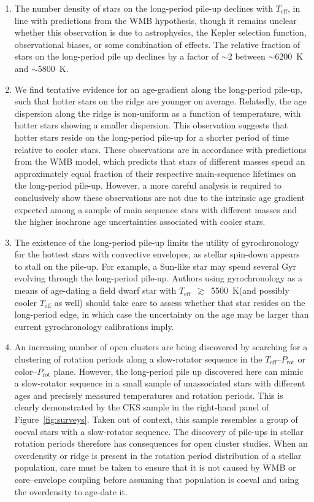 \documentclass[linenumbers,trackchanges,twocolumn]{aastex631}
\newcommand{\teffmin}{5500~K\xspace}
\newcommand{\teff}{\ensuremath{T_{\mathrm{eff}}}\xspace}
\newcommand{\prot}{\ensuremath{P_\mathrm{rot}}\xspace}
\begin{document}
\begin{enumerate}
    \item The number density of stars on the long-period pile-up declines with \teff, in line with predictions from the WMB hypothesis, though it remains unclear whether this observation is due to astrophysics, the Kepler selection function, observational biases, or some combination of effects. The relative fraction of stars on the long-period pile up declines by a factor of $\sim$2 between $\sim$6200~K and $\sim$5800~K. 
    
    \item We find tentative evidence for an age-gradient along the long-period pile-up, such that hotter stars on the ridge are younger on average. Relatedly, the age dispersion along the ridge is non-uniform as a function of temperature, with hotter stars showing a smaller dispersion. This observation suggests that hotter stars reside on the long-period pile-up for a shorter period of time relative to cooler stars. These observations are in accordance with predictions from the WMB model, which predicts that stars of different masses spend an approximately equal fraction of their respective main-sequence lifetimes on the long-period pile-up. However, a more careful analysis is required to conclusively show these observations are not due to the intrinsic age gradient expected among a sample of main sequence stars with different masses and the higher isochrone age uncertainties associated with cooler stars.
    
    \item The existence of the long-period pile-up limits the utility of gyrochronology for the hottest stars with convective envelopes, as stellar spin-down appears to stall on the pile-up. For example, a Sun-like star may spend several Gyr evolving through the long-period pile-up. Authors using gyrochronology as a means of age-dating a field dwarf star with \teff~$\gtrsim$~\teffmin (and possibly cooler \teff as well) should take care to assess whether that star resides on the long-period edge, in which case the uncertainty on the age may be larger than current gyrochronology calibrations imply.
    
    \item An increasing number of open clusters are being discovered by searching for a clustering of rotation periods along a slow-rotator sequence in the \teff–\prot or color–\prot plane. However, the long-period pile up discovered here can mimic a slow-rotator sequence in a small sample of unassociated stars with different ages and precisely measured temperatures and rotation periods. This is clearly demonstrated by the CKS sample in the right-hand panel of Figure~\ref{fig:surveys}. Taken out of context, this sample resembles a group of coeval stars with a slow-rotator sequence. The discovery of pile-ups in stellar rotation periods therefore has consequences for open cluster studies. When an overdensity or ridge is present in the rotation period distribution of a stellar population, care must be taken to ensure that it is not caused by WMB or core–envelope coupling before assuming that population is coeval and using the overdensity to age-date it.
    
\end{enumerate}
\end{document}
